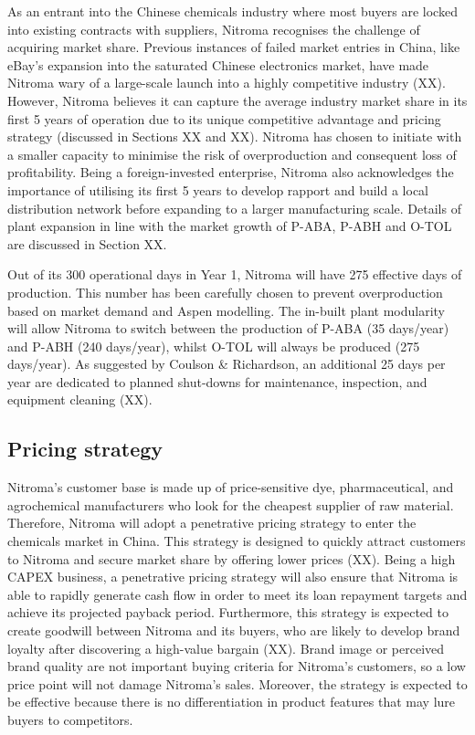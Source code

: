 As an entrant into the Chinese chemicals industry where most buyers are locked into existing contracts with suppliers, Nitroma recognises the challenge of acquiring market share. Previous instances of failed market entries in China, like eBay’s expansion into the saturated Chinese electronics market, have made Nitroma wary of a large-scale launch into a highly competitive industry (XX). However, Nitroma believes it can capture the average industry market share in its first 5 years of operation due to its unique competitive advantage and pricing strategy (discussed in Sections XX and XX). Nitroma has chosen to initiate with a smaller capacity to minimise the risk of overproduction and consequent loss of profitability. Being a foreign-invested enterprise, Nitroma also acknowledges the importance of utilising its first 5 years to develop rapport and build a local distribution network before expanding to a larger manufacturing scale. Details of plant expansion in line with the market growth of P-ABA, P-ABH and O-TOL are discussed in Section XX.

Out of its 300 operational days in Year 1, Nitroma will have 275 effective days of production. This number has been carefully chosen to prevent overproduction based on market demand and Aspen modelling. The in-built plant modularity will allow Nitroma to switch between the production of P-ABA (35 days/year) and P-ABH (240 days/year), whilst O-TOL will always be produced (275 days/year). As suggested by Coulson \& Richardson, an additional 25 days per year are dedicated to planned shut-downs for maintenance, inspection, and equipment cleaning (XX). 

\subsection{Pricing strategy}
Nitroma’s customer base is made up of price-sensitive dye, pharmaceutical, and agrochemical manufacturers who look for the cheapest supplier of raw material. Therefore, Nitroma will adopt a penetrative pricing strategy to enter the chemicals market in China. This strategy is designed to quickly attract customers to Nitroma and secure market share by offering lower prices (XX). Being a high CAPEX business, a penetrative pricing strategy will also ensure that Nitroma is able to rapidly generate cash flow in order to meet its loan repayment targets and achieve its projected payback period. Furthermore, this strategy is expected to create goodwill between Nitroma and its buyers, who are likely to develop brand loyalty after discovering a high-value bargain (XX). Brand image or perceived brand quality are not important buying criteria for Nitroma’s customers, so a low price point will not damage Nitroma’s sales. Moreover, the strategy is expected to be effective because there is no differentiation in product features that may lure buyers to competitors.

